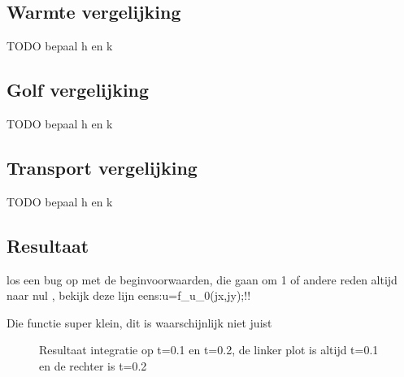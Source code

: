 \documentclass[11pt]{article} %
\begin{document}
	\subsection{Warmte vergelijking}
	TODO bepaal h en k
	\subsection{Golf vergelijking}
	TODO bepaal h en k
	\subsection{Transport vergelijking}
	TODO bepaal h en k
	\subsection{Resultaat}
	los een bug op met de beginvoorwaarden, die gaan om 1 of andere reden altijd naar nul , bekijk deze lijn eens:u=f\_u\_0(jx,jy);!!
	
	Die functie super klein, dit is waarschijnlijk niet juist
	\begin{figure}[H]
		\centering
		\hfill
	
		\caption{Resultaat integratie op t=0.1 en t=0.2, de linker plot is altijd t=0.1 en de rechter is t=0.2}
	\end{figure}
\end{document}
